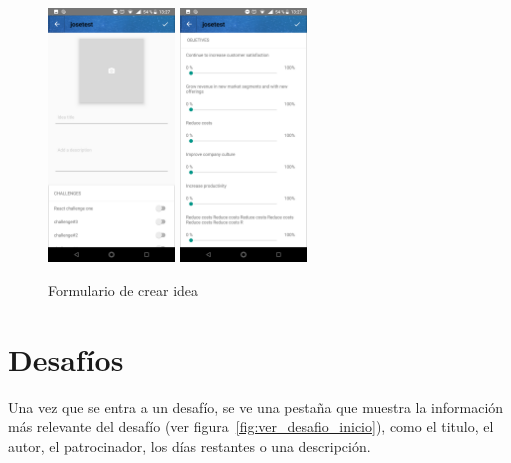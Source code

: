 \begin{figure}[!h]
	\begin{center}
		\includegraphics[width=0.3\textwidth]{./img/anexo1/crear_idea.png}
		\includegraphics[width=0.3\textwidth]{./img/anexo1/crear_idea_cont.png}
		\caption{Formulario de crear idea}
		\label{fig:crear_idea}
	\end{center}
\end{figure}

\section{Desafíos}

Una vez que se entra a un desafío, se ve una pestaña que muestra la información más 
relevante del desafío (ver figura~\ref{fig:ver_desafio_inicio}), como el titulo, el autor, el 
patrocinador, los días restantes o una descripción. 

